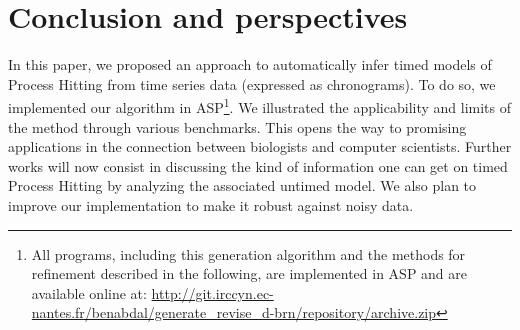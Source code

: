 \section{Conclusion and perspectives}
\label{sec:conclusion}

In this paper, we proposed an approach to automatically infer timed models of Process Hitting from time series data (expressed as chronograms). To do so, we implemented our algorithm in ASP\footnote{All programs, including this generation algorithm and the methods for refinement described in the following, are implemented in ASP and are available online at: \url{http://git.irccyn.ec-nantes.fr/benabdal/generate_revise_d-brn/repository/archive.zip}}. We illustrated the applicability and limits of the method through various benchmarks. This opens the way to promising applications in the connection between biologists and computer scientists. Further works will now consist in discussing the kind of information one can get on timed Process Hitting by analyzing the associated untimed model. We also plan to improve our implementation to make it robust against noisy data.  
